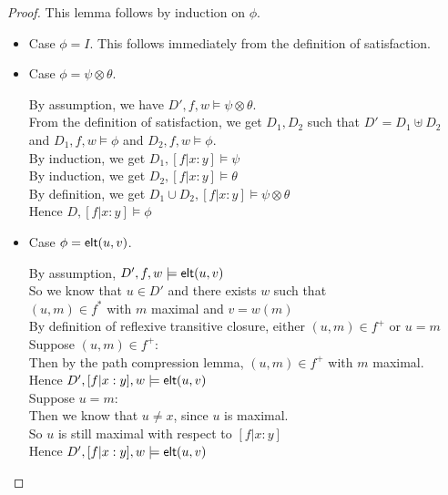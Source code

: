 \begin{proof}
This lemma follows by induction on $\phi$. 
\begin{itemize}
\item Case $\phi = I$. This follows immediately from the definition of satisfaction. 
\item Case $\phi = \psi \otimes \theta$. 
  \begin{tabbedproof}
    \oo By assumption, we have $D', f, w \models \psi \otimes \theta$. \\
    \ooo From the definition of satisfaction, we get  $D_1, D_2$ such that $D' = D_1 \uplus D_2$ \\
    \oox and $D_1, f, w \models \phi$ and $D_2, f, w \models \phi$.  \\
    \ooo By induction, we get $D_1, [f|x:y] \models \psi$ \\
    \ooo By induction, we get $D_2, [f|x:y] \models \theta$ \\
    \ooo By definition, we get $D_1 \cup D_2, [f|x:y] \models \psi \otimes \theta$ \\
    \ooo Hence $D, [f|x:y] \models \phi$ \\
  \end{tabbedproof}
\item Case $\phi = \mathsf{elt}({u}, {v})$.
  \begin{tabbedproof}
    \oo By assumption, $D', f, w \models \mathsf{elt}({u}, {v})$ \\
    \oo So we know that $u \in D'$ and there exists $w$ such that \\
    \ox $(u,m) \in f^*$ with $m$ maximal and $v = w(m)$ \\
    \oo By definition of reflexive transitive closure, either $(u, m) \in f^+$ or $u = m$ \\
    \oo Suppose $(u,m) \in f^+$:\\
    \ooo Then by the path compression lemma, $(u,m) \in f^+$ with $m$ maximal.  \\
    \ooo Hence $D', [f|x:y], w \models \mathsf{elt}({u}, {v})$  \\
    \oo Suppose $u = m$: \\
    \ooo Then we know that $u \not= x$, since $u$ is maximal. \\
    \ooo So $u$ is still maximal with respect to $[f|x:y]$ \\
    \ooo Hence $D', [f|x:y], w \models \mathsf{elt}({u}, {v})$
  \end{tabbedproof}
\end{itemize}
\end{proof}


